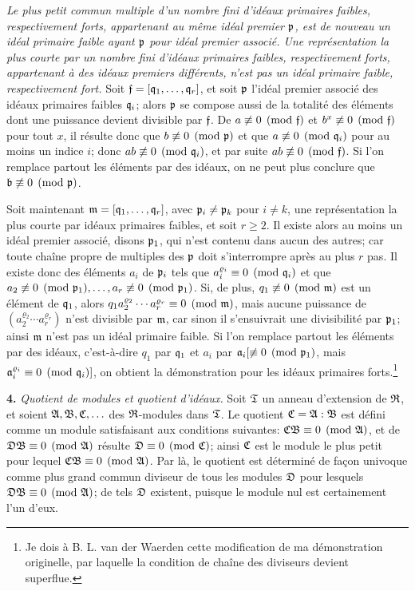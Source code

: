 \emph{Le plus petit commun multiple d'un nombre fini d'idéaux primaires faibles, respectivement forts, appartenant au même idéal premier $\mathfrak{p}$, est de nouveau un idéal primaire faible ayant $\mathfrak{p}$ pour idéal premier associé. Une représentation la plus courte par un nombre fini d'idéaux primaires faibles, respectivement forts, appartenant à des idéaux premiers différents, n'est pas un idéal primaire faible, respectivement fort.} Soit $\mathfrak{f}=[\mathfrak{q}_1,\ldots,\mathfrak{q}_r]$, et soit $\mathfrak{p}$ l'idéal premier associé des idéaux primaires faibles $\mathfrak{q}_i$; alors $\mathfrak{p}$ se compose aussi de la totalité des éléments dont une puissance devient divisible par $\mathfrak{f}$. De $a\not\equiv0\pmod{\mathfrak{f}}$ et $b^x\not\equiv0\pmod{\mathfrak{f}}$ pour tout $x$, il résulte donc que $b\not\equiv0\pmod{\mathfrak{p}}$ et que $a\not\equiv0\pmod{\mathfrak{q}_i}$ pour au moins un indice $i$; donc $ab\not\equiv0\pmod{\mathfrak{q}_i}$, et par suite $ab\not\equiv0\pmod{\mathfrak{f}}$. Si l'on remplace partout les éléments par des idéaux, on ne peut plus conclure que $\mathfrak{b}\not\equiv0\pmod{\mathfrak{p}}$.

Soit maintenant $\mathfrak{m}=[\mathfrak{q}_1,\ldots,\mathfrak{q}_r]$, avec $\mathfrak{p}_i\ne\mathfrak{p}_k$ pour $i\ne k$, une représentation la plus courte par idéaux primaires faibles, et soit $r\ge2$. Il existe alors au moins un idéal premier associé, disons $\mathfrak{p}_1$, qui n'est contenu dans aucun des autres; car toute chaîne propre de multiples des $\mathfrak{p}$ doit s'interrompre après au plus $r$ pas. Il existe donc des éléments $a_i$ de $\mathfrak{p}_i$ tels que $a_i^{\varrho_i}\equiv0\pmod{\mathfrak{q}_i}$ et que $a_2\not\equiv0\pmod{\mathfrak{p}_1},\ldots,a_r\not\equiv0\pmod{\mathfrak{p}_1}$. Si, de plus, $q_1\not\equiv0\pmod{\mathfrak{m}}$ est un élément de $\mathfrak{q}_1$, alors $q_1 a_2^{\varrho_2}\cdots a_r^{\varrho_r}\equiv0\pmod{\mathfrak{m}}$, mais aucune puissance de $(a_2^{\varrho_2}\cdots a_r^{\varrho_r})$ n'est divisible par $\mathfrak{m}$, car sinon il s'ensuivrait une divisibilité par $\mathfrak{p}_1$; ainsi $\mathfrak{m}$ n'est pas un idéal primaire faible. Si l'on remplace partout les éléments par des idéaux, c'est-à-dire $q_1$ par $\mathfrak{q}_1$ et $a_i$ par $\mathfrak{a}_i[\not\equiv0\pmod{\mathfrak{p}_1}$, mais $\mathfrak{a}_i^{\varrho_i}\equiv0\pmod{\mathfrak{q}_i}]$, on obtient la démonstration pour les idéaux primaires forts.\footnote{Je dois à B. L. van der Waerden cette modification de ma démonstration originelle, par laquelle la condition de chaîne des diviseurs devient superflue.}

\textbf{4.} \emph{Quotient de modules et quotient d'idéaux.} Soit $\mathfrak{T}$ un anneau d'extension de $\mathfrak{R}$, et soient $\mathfrak{A},\mathfrak{B},\mathfrak{C},\ldots$ des $\mathfrak{R}$-modules dans $\mathfrak{T}$. Le quotient $\mathfrak{C}=\mathfrak{A}:\mathfrak{B}$ est défini comme un module satisfaisant aux conditions suivantes: $\mathfrak{C}\mathfrak{B}\equiv0\pmod{\mathfrak{A}}$, et de $\mathfrak{D}\mathfrak{B}\equiv0\pmod{\mathfrak{A}}$ résulte $\mathfrak{D}\equiv0\pmod{\mathfrak{C}}$; ainsi $\mathfrak{C}$ est le module le plus petit pour lequel $\mathfrak{C}\mathfrak{B}\equiv0\pmod{\mathfrak{A}}$. Par là, le quotient est déterminé de façon univoque comme plus grand commun diviseur de tous les modules $\mathfrak{D}$ pour lesquels $\mathfrak{D}\mathfrak{B}\equiv0\pmod{\mathfrak{A}}$; de tels $\mathfrak{D}$ existent, puisque le module nul est certainement l'un d'eux.

